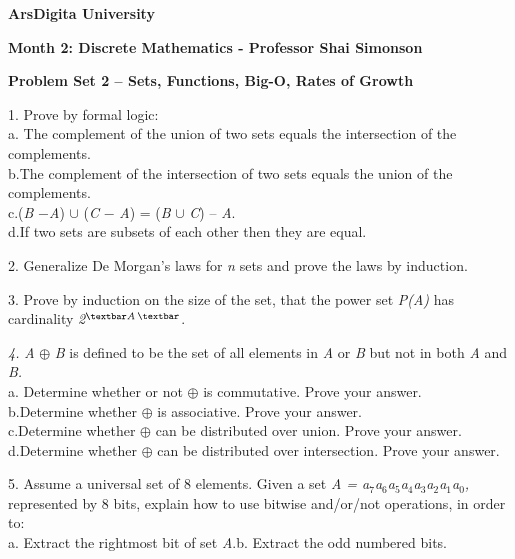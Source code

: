 \documentclass{article}
\newcommand{\tab}{\makebox[4em]{}}
\begin{document}
\begin{center}
\textbf{ArsDigita University}


\end{center}

\begin{center}
\textbf{Month 2: Discrete Mathematics - Professor Shai Simonson}


\end{center}

\begin{center}
\textbf{Problem Set 2 -- Sets, Functions, Big-O, Rates of Growth}


\end{center}

1.\tab 
Prove by formal logic:\\
a.\tab 
The complement of the union of two sets equals the intersection 
of the complements.\\
b.\tab The complement of the intersection of two sets equals the union 
of the complements.\\
c.\tab (\textit{B} \ensuremath{-}\textit{A}) \ensuremath{\cup} (\textit{C} \ensuremath{-} \textit{A}) = (\textit{B} \ensuremath{\cup} \textit{C}) 
-- \textit{A}. \\
d.\tab If two sets are subsets of each other then they are equal.


2.\tab 
Generalize De Morgan's laws for \textit{n} sets and prove the laws 
by induction.


3.\tab 
Prove by induction on the size of the set, that the power set \textit{P(A)} has 
cardinality \textit{2}$^{\mathit{{\textbar}A}}$$^{{\textbar}}$.


\textit{4.\tab }
\textit{A} \ensuremath{\oplus} \textit{B} is defined to be the set of all elements 
in \textit{A} or \textit{B} but not in both \textit{A} and \textit{B.} \\
a.\tab 
Determine whether or not \ensuremath{\oplus} is commutative. Prove your 
answer. \\
b.\tab Determine whether \ensuremath{\oplus} is associative. Prove your answer.\\
c.\tab Determine whether \ensuremath{\oplus} can be distributed over union. 
Prove your answer.\\
d.\tab Determine whether \ensuremath{\oplus} can be distributed over intersection. 
Prove your answer.


5.\tab 
Assume a universal set of 8 elements. Given a set \textit{A = a}$_{\mathit{7}}$\textit{a}$_{\mathit{6}}$\textit{a}$_{\mathit{5}}$\textit{a}$_{\mathit{4}}$\textit{a}$_{\mathit{3}}$\textit{a}$_{\mathit{2}}$\textit{a}$_{\mathit{1}}$\textit{a}$_{\mathit{0}}$\textit{,} 
represented by 8 bits, explain how to use bitwise and/or/not 
operations, in order to:\\
a.\tab 
Extract the rightmost bit of set \textit{A}.\tab b. Extract the odd numbered 
bits. 
\end{document}
